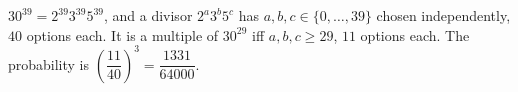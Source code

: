 $30^{39}=2^{39}3^{39}5^{39}$, and a divisor $2^a3^b5^c$ has $a,b,c\in\{0,\dots,39\}$ chosen independently, $40$ options each. It is a multiple of $30^{29}$ iff $a,b,c\ge29$, $11$ options each. The probability is $\left(\dfrac{11}{40}\right)^3=\boxed{\dfrac{1331}{64000}}$.

